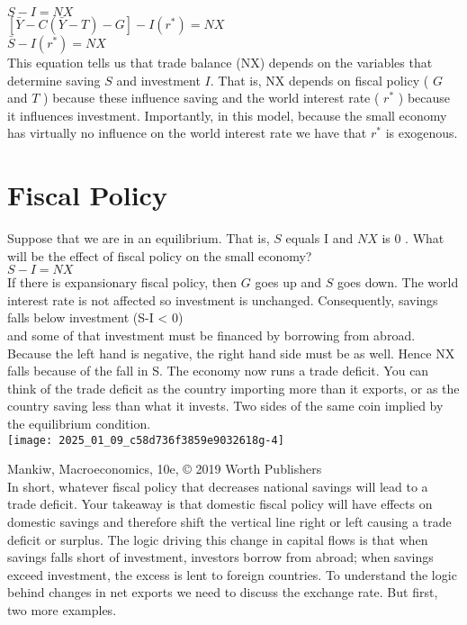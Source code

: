 \documentclass[10pt]{article}
\begin{document}
$S-I=N X$\\
$[\bar{Y}-C(\bar{Y}-T)-G]-I\left(r^{*}\right)=N X$\\
$\bar{S}-I\left(r^{*}\right)=N X$\\
This equation tells us that trade balance (NX) depends on the variables that determine saving $S$ and investment $I$. That is, NX depends on fiscal policy ( $G$ and $T$ ) because these influence saving and the world interest rate ( $r^{*}$ ) because it influences investment. Importantly, in this model, because the small economy has virtually no influence on the world interest rate we have that $r^{*}$ is exogenous.

\section*{Fiscal Policy}
Suppose that we are in an equilibrium. That is, $S$ equals I and $N X$ is 0 . What will be the effect of fiscal policy on the small economy?\\
$S-I=N X$\\
If there is expansionary fiscal policy, then $G$ goes up and $S$ goes down. The world interest rate is not affected so investment is unchanged. Consequently, savings falls below investment (S-I < 0)\\
and some of that investment must be financed by borrowing from abroad. Because the left hand is negative, the right hand side must be as well. Hence NX falls because of the fall in S. The economy now runs a trade deficit. You can think of the trade deficit as the country importing more than it exports, or as the country saving less than what it invests. Two sides of the same coin implied by the equilibrium condition.\\
\texttt{[image: 2025\_01\_09\_c58d736f3859e9032618g-4]}

Mankiw, Macroeconomics, 10e, © 2019 Worth Publishers\\
In short, whatever fiscal policy that decreases national savings will lead to a trade deficit. Your takeaway is that domestic fiscal policy will have effects on domestic savings and therefore shift the vertical line right or left causing a trade deficit or surplus. The logic driving this change in capital flows is that when savings falls short of investment, investors borrow from abroad; when savings exceed investment, the excess is lent to foreign countries. To understand the logic behind changes in net exports we need to discuss the exchange rate. But first, two more examples.
\end{document}
